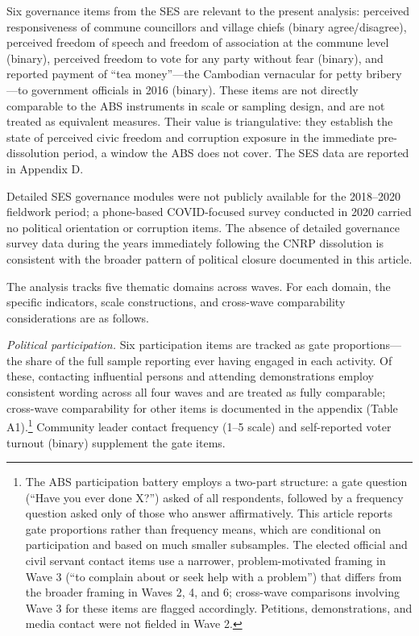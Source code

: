 \documentclass[Review,times,sageh,doublespace]{sagej}
\begin{document}
Six governance items from the SES are relevant to the present analysis:
perceived responsiveness of commune councillors and village chiefs
(binary agree/disagree), perceived freedom of speech and freedom of
association at the commune level (binary), perceived freedom to vote for
any party without fear (binary), and reported payment of ``tea
money''---the Cambodian vernacular for petty bribery---to government
officials in 2016 (binary). These items are not directly comparable to
the ABS instruments in scale or sampling design, and are not treated as
equivalent measures. Their value is triangulative: they establish the
state of perceived civic freedom and corruption exposure in the
immediate pre-dissolution period, a window the ABS does not cover. The
SES data are reported in Appendix D.

Detailed SES governance modules were not publicly available for the
2018--2020 fieldwork period; a phone-based COVID-focused survey
conducted in 2020 carried no political orientation or corruption items.
The absence of detailed governance survey data during the years
immediately following the CNRP dissolution is consistent with the
broader pattern of political closure documented in this article.

The analysis tracks five thematic domains across waves. For each domain,
the specific indicators, scale constructions, and cross-wave
comparability considerations are as follows.

\emph{Political participation.} Six participation items are tracked as
gate proportions---the share of the full sample reporting ever having
engaged in each activity. Of these, contacting influential persons and
attending demonstrations employ consistent wording across all four waves
and are treated as fully comparable; cross-wave comparability for other
items is documented in the appendix (Table A1).\footnote{The ABS
  participation battery employs a two-part structure: a gate question
  (``Have you ever done X?'') asked of all respondents, followed by a
  frequency question asked only of those who answer affirmatively. This
  article reports gate proportions rather than frequency means, which
  are conditional on participation and based on much smaller subsamples.
  The elected official and civil servant contact items use a narrower,
  problem-motivated framing in Wave 3 (``to complain about or seek help
  with a problem'') that differs from the broader framing in Waves 2, 4,
  and 6; cross-wave comparisons involving Wave 3 for these items are
  flagged accordingly. Petitions, demonstrations, and media contact were
  not fielded in Wave 2.} Community leader contact frequency (1--5
scale) and self-reported voter turnout (binary) supplement the gate
items.
\end{document}
